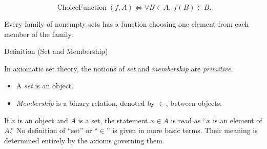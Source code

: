 \begin{remark*}
\[
  \operatorname{ChoiceFunction}(f,A)
  \iff
  \forall B\in A,\ f(B)\in B.
\]
\end{remark*}

\begin{remark*}[Interpretation]
Every family of nonempty sets has a function choosing one element from each
member of the family.
\end{remark*}

\NoLocalDependencies

\begin{definitionbox}{Definition (Set and Membership)}
\begin{definition}\label{def:set-membership}
In axiomatic set theory, the notions of \emph{set} and \emph{membership} are
\emph{primitive}.

\begin{itemize}
  \item A \emph{set} is an object.
  \item \emph{Membership} is a binary relation, denoted by $\in$, between objects.
\end{itemize}

If $x$ is an object and $A$ is a set, the statement $x \in A$ is read as
``$x$ is an element of $A$.'' No definition of ``set'' or ``$\in$'' is given
in more basic terms. Their meaning is determined entirely by the axioms
governing them.
\end{definition}
\end{definitionbox}

